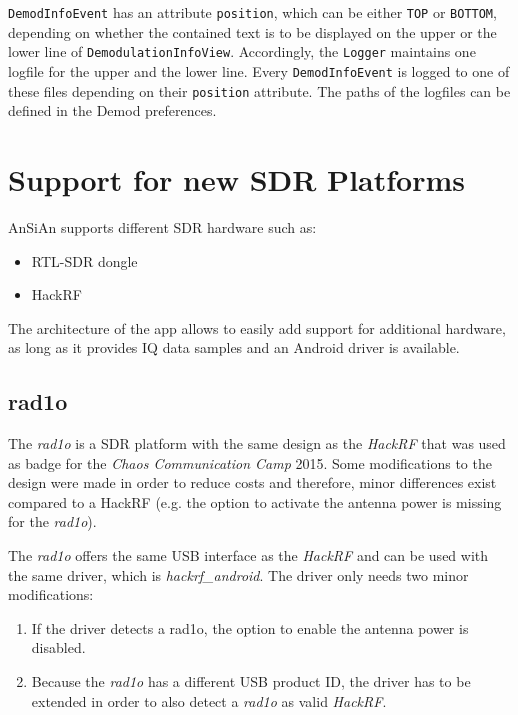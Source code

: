 \texttt{DemodInfoEvent} has an attribute \texttt{position}, which can be either \texttt{TOP} or \texttt{BOTTOM}, depending on whether the contained text is to be displayed on the upper or the lower line of \texttt{DemodulationInfoView}. Accordingly, the \texttt{Logger} maintains one logfile for the upper and the lower line. Every \texttt{DemodInfoEvent} is logged to one of these files depending on their \texttt{position} attribute. The paths of the logfiles can be defined in the Demod preferences.


\section{Support for new SDR Platforms}

\ac{AnSiAn} supports different \ac{SDR} hardware such as:
\begin{itemize}
	\item RTL-SDR dongle
	\item HackRF
\end{itemize}

The architecture of the app allows to easily add support for additional hardware,
as long as it provides IQ data samples and an Android driver is available.

\subsection{rad1o}

The \emph{rad1o} is a \ac{SDR} platform with the same design as the
\emph{HackRF} that was used as badge for the \emph{Chaos Communication Camp}
2015. Some modifications to the design were made in order to reduce costs and
therefore, minor differences exist compared to a HackRF (e.g. the option to
activate the antenna power is missing for the \emph{rad1o}).

The \emph{rad1o} offers the same USB interface as the \emph{HackRF} and can be
used with the same driver, which is \emph{hackrf\_android}. The driver only needs
two minor modifications:
\begin{enumerate}
	\item If the driver detects a rad1o, the option to enable the antenna power
		is disabled.
	\item Because the \emph{rad1o} has a different USB product ID, the driver has
		to be extended in order to also detect a \emph{rad1o} as valid \emph{HackRF}.
\end{enumerate}


